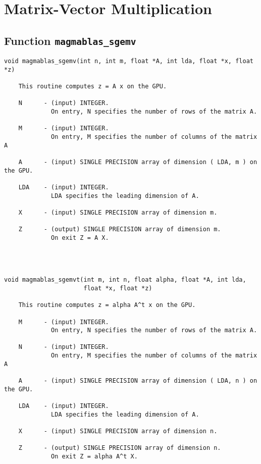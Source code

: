 \documentclass[10pt]{book}
\begin{document}
\newpage
\section{Matrix-Vector Multiplication}

\vspace{0.2in}
\subsection{Function {\tt {\bf magmablas\_sgemv}}}

\vspace{0.1in}
\begin{verbatim}
void magmablas_sgemv(int n, int m, float *A, int lda, float *x, float *z)

    This routine computes z = A x on the GPU.

    N      - (input) INTEGER.
             On entry, N specifies the number of rows of the matrix A.

    M      - (input) INTEGER.
             On entry, M specifies the number of columns of the matrix A

    A      - (input) SINGLE PRECISION array of dimension ( LDA, m ) on the GPU.

    LDA    - (input) INTEGER.
             LDA specifies the leading dimension of A.

    X      - (input) SINGLE PRECISION array of dimension m.

    Z      - (output) SINGLE PRECISION array of dimension m.
             On exit Z = A X.




void magmablas_sgemvt(int m, int n, float alpha, float *A, int lda,
                      float *x, float *z)

    This routine computes z = alpha A^t x on the GPU.

    M      - (input) INTEGER.
             On entry, N specifies the number of rows of the matrix A.

    N      - (input) INTEGER.
             On entry, M specifies the number of columns of the matrix A

    A      - (input) SINGLE PRECISION array of dimension ( LDA, n ) on the GPU.

    LDA    - (input) INTEGER.
             LDA specifies the leading dimension of A.

    X      - (input) SINGLE PRECISION array of dimension n.

    Z      - (output) SINGLE PRECISION array of dimension n.
             On exit Z = alpha A^t X.
\end{verbatim}
\end{document}
